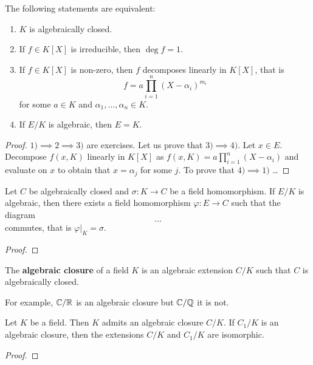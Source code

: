 \begin{proposition}
	The following statements are equivalent:
	\begin{enumerate}
		\item $K$ is algebraically closed.
		\item If $f\in K[X]$ is irreducible, then $\deg f=1$.
		\item If $f\in K[X]$ is non-zero, then $f$ decomposes linearly in $K[X]$, that is
			\[
				f=a\prod_{i=1}^n(X-\alpha_i)^{m_i}
			\]
			for some $a\in K$ and $\alpha_1,\dots,\alpha_n\in K$. 
		\item If $E/K$ is algebraic, then $E=K$. 
	\end{enumerate}
\end{proposition}

\begin{proof}
	$1)\implies 2\implies 3)$ are exercises.
	Let us prove that $3)\implies 4)$. Let $x\in E$. Decompose $f(x,K)$ linearly in $K[X]$ as 
	$f(x,K)=a\prod_{i=1}^n(X-\alpha_i)$ 
	and
evaluate on $x$ to obtain that $x=\alpha_j$ for some $j$. To prove that $4)\implies 1)$ \dots
\end{proof}

\begin{proposition}
	Let $C$ be algebraically closed and $\sigma\colon K\to C$ be a field homomorphism. If $E/K$ 
	is algebraic, then there exists a field homomorphism 
	$\varphi\colon E\to C$ such that 
	the diagram
	\[
		\dots
	\]
	commutes, that is 
	$\varphi|_K=\sigma$. 
\end{proposition}

\begin{proof}
\end{proof}

\begin{definition}
	The \textbf{algebraic closure} of a field $K$ is an algebraic extension $C/K$ 
	such that $C$ is algebraically closed. 
\end{definition}

For example, $\mathbb{C}/\mathbb{R}$ is an algebraic closure but $\mathbb{C}/\mathbb{Q}$ it is not. 


\begin{theorem}[Artin]
	Let $K$ be a field. Then $K$ admits an algebraic closure $C/K$. If $C_1/K$ 
	is an algebraic closure, then the extensions $C/K$ and $C_1/K$ are isomorphic. 
\end{theorem}

\begin{proof}
\end{proof}
